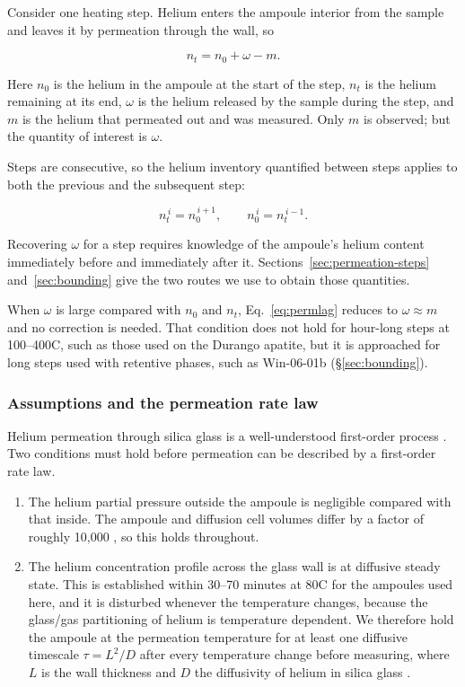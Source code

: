Consider one heating step. Helium enters the ampoule interior from the sample and leaves it by permeation through the wall, so

\begin{equation}
\label{eq:permlag}
n_{t} = n_{0} + \omega - m .
\end{equation}

Here $n_{0}$ is the helium in the ampoule at the start of the step, $n_{t}$ is the helium remaining at its end, $\omega$ is the helium released by the sample during the step, and $m$ is the helium that permeated out and was measured. Only $m$ is observed; but the quantity of interest is $\omega$.

Steps are consecutive, so the helium inventory quantified between steps applies to both the previous and the subsequent step:

\begin{equation}
\label{eq:carry}
n_{t}^{\,i} = n_{0}^{\,i+1}, \qquad n_{0}^{\,i} = n_{t}^{\,i-1} .
\end{equation}

Recovering $\omega$ for a step requires knowledge of the ampoule's helium content immediately before and immediately after it. Sections~\ref{sec:permeation-steps} and~\ref{sec:bounding} give the two routes we use to obtain those quantities.

When $\omega$ is large compared with $n_{0}$ and $n_{t}$, Eq.~\eqref{eq:permlag} reduces to $\omega \approx m$ and no correction is needed. That condition does not hold for hour-long steps at 100--400\textdegree C, such as those used on the Durango apatite, but it is approached for long steps used with retentive phases, such as Win-06-01b (\S\ref{sec:bounding}).

\subsubsection{Assumptions and the permeation rate law}\label{sec:assumptions}

Helium permeation through silica glass is a well-understood first-order process \citep{norton1953,altemose1961,swets1961,masaryk1968}. Two conditions must hold before permeation can be described by a first-order rate law.

\begin{enumerate}
\item The helium partial pressure outside the ampoule is negligible compared with that inside. The ampoule and diffusion cell volumes differ by a factor of roughly 10,000 \citep{farley1999}, so this holds throughout.
\item The helium concentration profile across the glass wall is at diffusive steady state. This is established within 30--70 minutes at 80\textdegree C for the ampoules used here, and it is disturbed whenever the temperature changes, because the glass/gas partitioning of helium is temperature dependent. We therefore hold the ampoule at the permeation temperature for at least one diffusive timescale $\tau = L^{2}/D$ after every temperature change before measuring, where $L$ is the wall thickness and $D$ the diffusivity of helium in silica glass \citep{swets1961}.
\end{enumerate}

